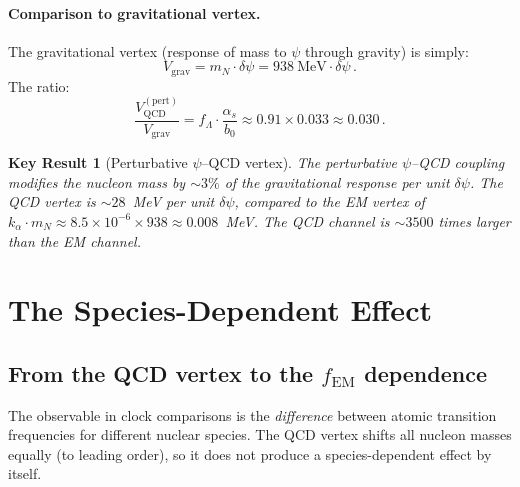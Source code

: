 \documentclass[aps,prd,twocolumn,superscriptaddress,floatfix,nofootinbib]{revtex4-2}
\newcommand{\as}{\alpha_s}
\newcommand{\fEM}{f_{\mathrm{EM}}}
\newcommand{\mN}{m_N}
\newcommand{\ka}{k_\alpha}
\newcommand{\dpsi}{\delta\psi}
\newtheorem{result}{Key Result}
\begin{document}
\paragraph{Comparison to gravitational vertex.}
The gravitational vertex (response of mass to $\psi$ through gravity) is
simply:
\begin{equation}
V_{\mathrm{grav}} = \mN \cdot \dpsi = 938~\text{MeV} \cdot \dpsi \, .
\end{equation}
The ratio:
\begin{equation}
\frac{V_{\mathrm{QCD}}^{(\mathrm{pert})}}{V_{\mathrm{grav}}}
= f_\Lambda \cdot \frac{\as}{b_0}
\approx 0.91 \times 0.033
\approx 0.030 \, .
\label{eq:ratio_pert}
\end{equation}

\begin{result}[Perturbative $\psi$--QCD vertex]
The perturbative $\psi$--QCD coupling modifies the nucleon mass by
$\sim 3\%$ of the gravitational response per unit $\dpsi$. The QCD vertex
is $\sim 28$~MeV per unit $\dpsi$, compared to the EM vertex of
$\ka \cdot \mN \approx 8.5 \times 10^{-6} \times 938 \approx 0.008$~MeV.
The QCD channel is $\sim 3500$ times larger than the EM channel.
\end{result}


\section{The Species-Dependent Effect}\label{sec:species}

\subsection{From the QCD vertex to the $\fEM$ dependence}
\label{sec:species_mechanism}

The observable in clock comparisons is the \emph{difference} between atomic
transition frequencies for different nuclear species. The QCD vertex shifts
all nucleon masses equally (to leading order), so it does not produce a
species-dependent effect by itself.
\end{document}
